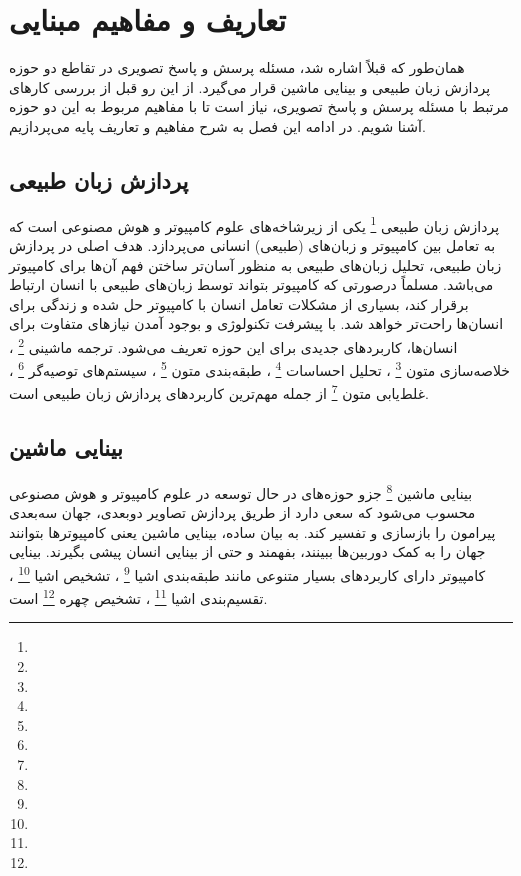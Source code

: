 \chapter{تعاریف و مفاهیم مبنایی}
\thispagestyle{empty}
	همان‌طور که قبلاً اشاره شد، مسئله پرسش و پاسخ تصویری در تقاطع دو حوزه پردازش زبان طبیعی و بینایی ماشین قرار می‌گیرد. از این رو قبل از بررسی کارهای مرتبط با مسئله پرسش و پاسخ تصویری، نیاز است تا با مفاهیم مربوط به این دو حوزه آشنا شویم. در ادامه این فصل به شرح مفاهیم و تعاریف پایه می‌پردازیم.

\section{پردازش زبان طبیعی}
	پردازش زبان‌ طبیعی 
	\footnote{}
	یکی از زیرشاخه‌های علوم کامپیوتر و هوش مصنوعی است که به تعامل بین کامپیوتر و زبان‌های (طبیعی) انسانی می‌پردازد. هدف اصلی در پردازش زبان طبیعی، تحلیل زبان‌های طبیعی به منظور آسان‌تر ساختن فهم آ‌ن‌ها برای کامپیوتر می‌باشد. مسلماً درصورتی که کامپیوتر بتواند توسط زبان‌های طبیعی با انسان ارتباط برقرار کند، بسیاری از مشکلات تعامل انسان با کامپیوتر حل شده و زندگی برای انسان‌ها راحت‌تر خواهد شد. با پیشرفت تکنولوژی و بوجود آمدن نیازهای متفاوت برای انسان‌ها، کاربردهای جدیدی برای این حوزه تعریف می‌شود. ترجمه ماشینی
	\footnote{}
	، خلاصه‌سازی متون
	\footnote{}
	، تحلیل احساسات
	\footnote{}
	، طبقه‌بندی متون
	\footnote{}
	، سیستم‌های توصیه‌گر
	\footnote{}
	، غلط‌یابی متون
	\footnote{}
	از جمله مهم‌ترین کاربردهای پردازش زبان طبیعی است.
	
\section{بینایی ماشین}
 بینایی ماشین
	\footnote{}
  جزو حوزه‌های در حال توسعه در علوم کامپیوتر و هوش مصنوعی محسوب می‌شود که سعی دارد از طریق پردازش تصاویر دوبعدی، جهان سه‌بعدی پیرامون را بازسازی و تفسیر کند. به بیان ساده، بینایی ماشین یعنی کامپیوترها بتوانند جهان را به کمک دوربین‌ها ببینند، بفهمند و حتی از بینایی انسان پیشی بگیرند. بینایی کامپیوتر دارای کاربردهای بسیار متنوعی مانند طبقه‌بندی اشیا
  \footnote{}
  ، تشخیص اشیا
  \footnote{}
  ، تقسیم‌بندی اشیا
  \footnote{}
  ، تشخیص چهره
  \footnote{}
   است.

